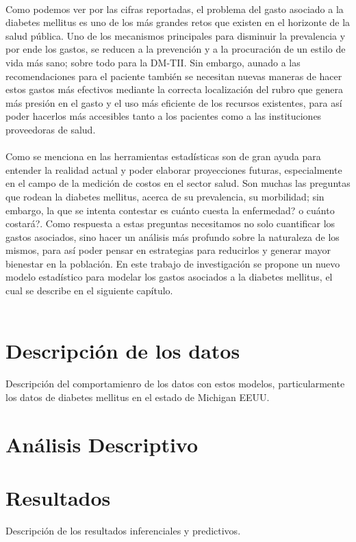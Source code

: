 \\
Como podemos ver por las cifras reportadas, el problema del gasto asociado a la diabetes mellitus es uno de los m\'as grandes retos que existen en el horizonte de la salud p\'ublica. Uno de los mecanismos principales para disminuir la prevalencia y por ende los gastos, se reducen a la prevenci\'on y a la procuraci\'on de un estilo de vida m\'as sano; sobre todo para la DM-TII. Sin embargo, aunado a las recomendaciones para el paciente tambi\'en se necesitan nuevas maneras de hacer estos gastos m\'as efectivos mediante la correcta localizaci\'on del rubro que genera m\'as presi\'on en el gasto y el uso m\'as eficiente de los recursos existentes, para as\'i poder hacerlos m\'as accesibles tanto a los pacientes como a las instituciones proveedoras de salud.\\
\\
Como se menciona en \cite{cichon1999modelling} las herramientas estad\'isticas son de gran ayuda para entender la realidad actual y poder elaborar proyecciones futuras, especialmente en el campo de la medici\'on de costos en el sector salud. Son muchas las preguntas que rodean la diabetes mellitus, acerca de su prevalencia, su morbilidad; sin embargo, la que se intenta contestar es cu\'anto cuesta la enfermedad? o cu\'anto costar\'a?. Como respuesta a estas preguntas necesitamos no solo cuantificar los gastos asociados, sino hacer un an\'alisis m\'as profundo sobre la naturaleza de los mismos, para as\'i poder pensar en estrategias para reducirlos y generar mayor bienestar en la poblaci\'on. En este trabajo de investigaci\'on se propone un nuevo modelo estad\'istico para modelar los gastos asociados a la diabetes mellitus, el cual se describe en el siguiente cap\'itulo.\\
\\
\section{Descripci\'on de los datos}
Descripci\'on del comportamienro de los datos con estos modelos, particularmente los datos de diabetes mellitus en el estado de Michigan EEUU.

\section{An\'alisis Descriptivo}

\section{Resultados}
Descripci\'on de los resultados inferenciales y predictivos.